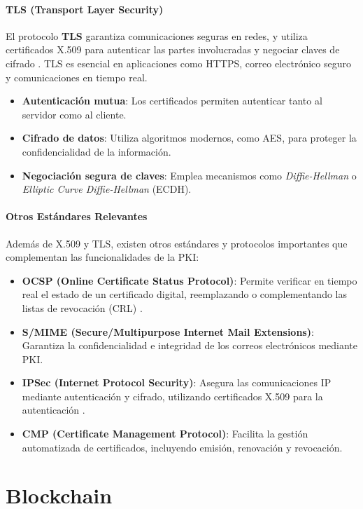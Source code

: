 \paragraph{TLS (Transport Layer Security)}  
El protocolo \textbf{TLS} garantiza comunicaciones seguras en redes, y utiliza certificados X.509 para autenticar las partes involucradas y negociar claves de cifrado \cite{dierks2008tls}. TLS es esencial en aplicaciones como HTTPS, correo electrónico seguro y comunicaciones en tiempo real.

\begin{itemize}
    \item \textbf{Autenticación mutua}: Los certificados permiten autenticar tanto al servidor como al cliente.
    \item \textbf{Cifrado de datos}: Utiliza algoritmos modernos, como AES, para proteger la confidencialidad de la información.
    \item \textbf{Negociación segura de claves}: Emplea mecanismos como \textit{Diffie-Hellman} o \textit{Elliptic Curve Diffie-Hellman} (ECDH).
\end{itemize}

\paragraph{Otros Estándares Relevantes}
Además de X.509 y TLS, existen otros estándares y protocolos importantes que complementan las funcionalidades de la PKI:

\begin{itemize}
    \item \textbf{OCSP (Online Certificate Status Protocol)}: Permite verificar en tiempo real el estado de un certificado digital, reemplazando o complementando las listas de revocación (CRL) \cite{rfc2560}.
    \item \textbf{S/MIME (Secure/Multipurpose Internet Mail Extensions)}: Garantiza la confidencialidad e integridad de los correos electrónicos mediante PKI.
    \item \textbf{IPSec (Internet Protocol Security)}: Asegura las comunicaciones IP mediante autenticación y cifrado, utilizando certificados X.509 para la autenticación \cite{kent1998ipsec}.
    \item \textbf{CMP (Certificate Management Protocol)}: Facilita la gestión automatizada de certificados, incluyendo emisión, renovación y revocación.
\end{itemize}

\section{Blockchain}


